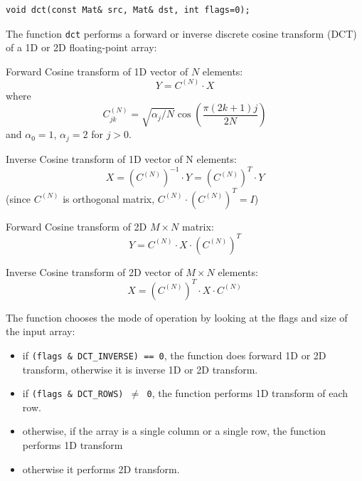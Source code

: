 \begin{lstlisting}
void dct(const Mat& src, Mat& dst, int flags=0);
\end{lstlisting}
\begin{description}
\end{description}

The function \texttt{dct} performs a forward or inverse discrete cosine transform (DCT) of a 1D or 2D floating-point array:

Forward Cosine transform of 1D vector of $N$ elements:
\[Y = C^{(N)} \cdot X\]
where
\[C^{(N)}_{jk}=\sqrt{\alpha_j/N}\cos\left(\frac{\pi(2k+1)j}{2N}\right)\]
and $\alpha_0=1$, $\alpha_j=2$ for $j > 0$.

Inverse Cosine transform of 1D vector of N elements:
\[X = \left(C^{(N)}\right)^{-1} \cdot Y = \left(C^{(N)}\right)^T \cdot Y\]
(since $C^{(N)}$ is orthogonal matrix, $C^{(N)} \cdot \left(C^{(N)}\right)^T = I$)

Forward Cosine transform of 2D $M \times N$ matrix:
\[Y = C^{(N)} \cdot X \cdot \left(C^{(N)}\right)^T\]

Inverse Cosine transform of 2D vector of $M \times N$ elements:
\[X = \left(C^{(N)}\right)^T \cdot X \cdot C^{(N)}\]

The function chooses the mode of operation by looking at the flags and size of the input array:
\begin{itemize}
    \item if \texttt{(flags \& DCT\_INVERSE) == 0}, the function does forward 1D or 2D transform, otherwise it is inverse 1D or 2D transform.
    \item if \texttt{(flags \& DCT\_ROWS) $\ne$ 0}, the function performs 1D transform of each row.
    \item otherwise, if the array is a single column or a single row, the function performs 1D transform
    \item otherwise it performs 2D transform.
\end{itemize}

